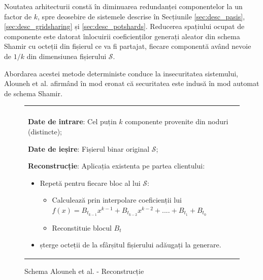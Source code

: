 \documentclass[oneside, 12pt]{book}
\begin{document}
Noutatea arhitecturii constă în diminuarea redundanței componentelor la un factor de $k$, spre deosebire de sistemele descrise în Secțiunile \ref{sec:desc_pasis}, \ref{sec:desc_gridsharing} și \ref{sec:desc_potshards}. Reducerea spațiului ocupat de componente este datorat înlocuirii coeficienților generați aleator din schema Shamir cu octeții din fișierul ce va fi partajat, fiecare componentă având nevoie de $1/k$ din dimensiunea fișierului $\mathcal{S}$.

Abordarea acestei metode deterministe conduce la insecuritatea sistemului, Alouneh et al. afirmând în mod eronat că securitatea este indusă în mod automat de schema Shamir. 

\begin{figure}[h!]

\begin{tabular}{|p{\textwidth}|}
\hline

\\
\hspace{.1in}
\textbf{Date de intrare}: Cel puțin $k$ componente provenite din noduri (distincte);
\medskip

\hspace{.1in}
\textbf{Date de ieșire}: Fișierul binar original $\mathcal{S}$;
\medskip

\hspace{.1in}
\textbf{Reconstrucție}: Aplicația existenta pe partea clientului: 
	\begin{itemize}
		\item Repetă pentru fiecare bloc al lui $\mathcal{S}$:
		\begin{itemize}
			\item Calculează prin interpolare coeficienții lui $f(x)=B_{t_{k - 1}}x ^ {k-1} + B_{t_{k - 2}}x ^ {k - 2} + .... + B_{t_1} + B_{t_0}$
			\item Reconstituie blocul $B_t$
		\end{itemize}
		\item șterge octeții de la sfârșitul fișierului adăugați la generare. 
	\end{itemize}

\\
\hline
\end{tabular}
\caption{Schema Alouneh et al. - Reconstrucție \cite{AAMK:2013}}
\label{fig:alouneh_reconstruction}
\end{figure}

\end{document}
